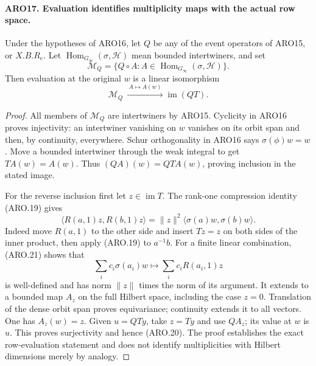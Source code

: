 \paragraph{ARO17. Evaluation identifies multiplicity maps with the actual row space.}
\label{claim:ARO17}
Under the hypotheses of ARO16, let \(Q\) be any of the event
operators of ARO15, or \(X.B.R_e\).  Let
\(\operatorname{Hom}_{G_\infty}(\sigma,\mathcal H)\) mean bounded
intertwiners, and set
\[
 \mathcal M_Q=\{Q\circ A:A\in
                    \operatorname{Hom}_{G_\infty}(\sigma,\mathcal H)\}.
\]
Then evaluation at the original \(w\) is a linear isomorphism
\[
              \mathcal M_Q\ \xrightarrow{\ A\mapsto A(w)\ }
                       \operatorname{im}(QT).        \tag{ARO.20}
\]
\begin{proof}
All members of \(\mathcal M_Q\) are intertwiners by ARO15.
Cyclicity in ARO16 proves injectivity: an intertwiner vanishing on
\(w\) vanishes on its orbit span and then, by continuity, everywhere.
Schur orthogonality in ARO16 says
\(\sigma(\phi)w=w\).  Move a bounded intertwiner through the
weak integral to get \(TA(w)=A(w)\).  Thus
\((Q A)(w)=QT A(w)\), proving inclusion in the stated image.

For the reverse inclusion first let \(z\in\operatorname{im}T\).
The rank-one compression identity (ARO.19) gives
\[
 \langle R(a,1)z,R(b,1)z\rangle
       =\|z\|^2\langle\sigma(a)w,\sigma(b)w\rangle.
 \tag{ARO.21}
\]
Indeed move \(R(a,1)\) to the other side and insert \(Tz=z\)
on both sides of the inner product, then apply (ARO.19) to
\(a^{-1}b\).  For a finite linear combination, (ARO.21) shows that
\[
 \sum_i c_i\sigma(a_i)w\longmapsto
                         \sum_i c_iR(a_i,1)z
\]
is well-defined and has norm \(\|z\|\) times the norm of its
argument.  It extends to a bounded map \(A_z\) on the full Hilbert
space, including the case \(z=0\).  Translation of the dense orbit
span proves equivariance; continuity extends it to all vectors.
One has \(A_z(w)=z\).  Given \(u=QT y\), take \(z=Ty\) and
use \(Q A_z\); its value at \(w\) is \(u\).  This proves
surjectivity and hence (ARO.20).  The proof establishes the exact
row-evaluation statement and does not identify multiplicities with
Hilbert dimensions merely by analogy.
\end{proof}

